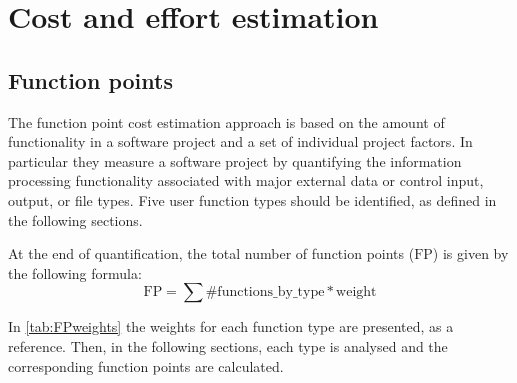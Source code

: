 \chapter{Cost and effort estimation}\label{chap:estimation}


\newcommand{\mSize}{\mathbf{s}}
\newcommand{\mFP}{\text{FP}}
\newcommand{\mEffort}{\mathbf{e}}
\newcommand{\eaf}{\text{EAF}}  %


\section{Function points}

The function point cost estimation approach is based on the amount of functionality in a software project and a set of individual project factors. In particular they measure a software project by quantifying the information processing functionality associated with major external data or control input, output, or file types. Five user function types should be identified, as defined in the following sections. 

At the end of quantification, the total number of function points ($ \mFP $) is given by the following formula:
\begin{equation}
\mFP = \sum \text{\#functions\_by\_type} * \text{weight} \label{eqn:fp}
\end{equation}


In \cref{tab:FPweights} the weights for each function type are presented, as a reference. Then, in the following sections, each type is analysed and the corresponding function points are calculated.

\newcommand{\myW}{1.5cm}

